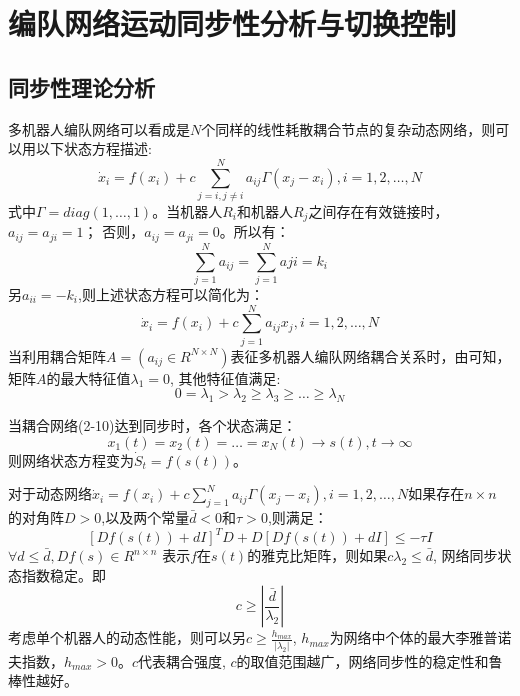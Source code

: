 \section{编队网络运动同步性分析与切换控制}

\subsection{同步性理论分析}
多机器人编队网络可以看成是$N$个同样的线性耗散耦合节点的复杂动态网络，则可以用以下状态方程描述\supercite{li2003synchronization}:
\begin{equation}
	\dot{x}_i = f(x_i) + c\sum_{j=i,j \neq i}^N a_{ij}\Gamma (x_j - x_i), i=1,2,\dots,N
\end{equation}
式中$\Gamma = diag(1,\dots,1)$。当机器人$R_i$和机器人$R_j$之间存在有效链接时，$a_{ij} = a_{ji} = 1$； 否则，$a_{ij} = a_{ji} = 0$。所以有：
\[
\sum_{j=1}^N a_{ij} = \sum_{j=1}^N a{ji} = k_i
\]
另$a_{ii} = -k_i$,则上述状态方程可以简化为：
\begin{equation}
	\dot{x}_i = f(x_i) + c\sum_{j=1}^N a_{ij}x_j, i=1,2,\dots,N 
\end{equation}
当利用耦合矩阵$A = (a_{ij} \in R^{N \times N})$表征多机器人编队网络耦合关系时，由\parencite{li2003synchronization}可知，矩阵$A$的最大特征值$\lambda_1 = 0$, 其他特征值满足:
\[
	0 = \lambda_1 > \lambda_2 \geq \lambda_3 \geq \dots \geq \lambda_N
\]

当耦合网络(2-10)达到同步时，各个状态满足：
\begin{equation}
	x_1(t) = x_2(t) = \dots = x_N(t) \rightarrow s(t), t \rightarrow \infty
\end{equation}
则网络状态方程变为$\dot{S}_t = f(s(t))$。

对于动态网络$\dot{x}_i = f(x_i) + c\sum_{j=1}^N a_{ij}\Gamma (x_j-x_i), i=1,2,\dots,N$如果存在$n \times n$ 的对角阵$D>0$,以及两个常量$\bar{d}<0$和$\tau>0$,则满足：
\begin{equation}
	{\left[ Df(s(t))+dI\right]}^TD + D\left[Df(s(t)) + dI\right] \leq -\tau I
\end{equation}
$\forall d \leq \bar{d}, Df(s) \in R^{n \times n}$ 表示$f$在$s(t)$的雅克比矩阵，则如果$c\lambda_2 \leq \bar{d}$, 网络同步状态指数稳定。即
\begin{equation}
	c \geq |\frac{\bar{d}}{\lambda_2}|
\end{equation}
考虑单个机器人的动态性能，则可以另$c \geq \frac{h_{max}}{|\lambda_2|}$, $h_{max}$为网络中个体的最大李雅普诺夫指数，$h_{max}>0$。$c$代表耦合强度, $c$的取值范围越广，网络同步性的稳定性和鲁棒性越好。

